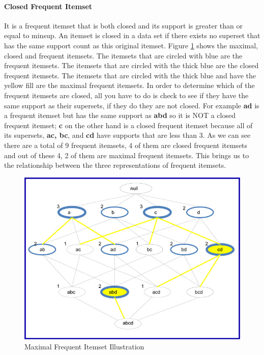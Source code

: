 \paragraph{Closed Frequent Itemset }
It is a frequent itemset that is both closed and its support is greater than or equal to minsup.
An itemset is closed in a data set if there exists no superset that has the same support count as this original itemset.
Figure \ref{fig:closedFISExample} shows the maximal, closed and frequent itemsets. The itemsets that are circled with blue are the frequent itemsets. The itemsets that are circled with the thick blue are the closed frequent itemsets. The itemsets that are circled with the thick blue and have the yellow fill are the maximal frequent itemsets. In order to determine which of the frequent itemsets are closed, all you have to do is check to see if they have the same support as their supersets, if they do they are not closed.
For example \textbf{ad} is a frequent itemset but has the same support as \textbf{abd} so it is NOT a closed frequent itemset; \textbf{c} on the other hand is a closed frequent itemset because all of its supersets, \textbf{ac, bc}, and \textbf{cd} have supports that are less than 3.
As we can see there are a total of 9 frequent itemsets, 4 of them are closed frequent itemsets and out of these 4, 2 of them are maximal frequent itemsets. This brings us to the relationship between the three representations of frequent itemsets.

\begin{figure}
  \centering
  \includegraphics[width=\linewidth]{figures/closedFISExample}
  \caption{Maximal Frequent Itemset Illustration}
  \label{fig:closedFISExample}
\end{figure}


